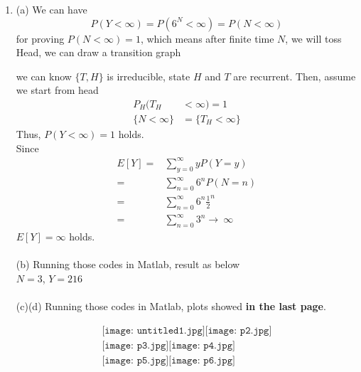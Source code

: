 \documentclass[12pt]{article}
\theoremstyle{remark}
\theoremstyle{definition}
\numberwithin{figure}{section}
\newcounter{fig}
\begin{document}
\begin{enumerate}[\textbf{4.}]
  \item 
(a) We can have 
\begin{equation*}
    P(Y<\infty ) = P(6^N <\infty )= P(N< \infty )
\end{equation*}
for proving $P(N< \infty) =1$, which means after finite time $N$, we will toss Head, we can draw a transition graph\\
\begin{center}
\end{center}
we can know $\big\{T,H\big\}$ is irreducible, state $H$ and $T$ are recurrent. Then, assume we start from head 
\begin{equation*}
\begin{align*}
     P_H(T_H &< \infty) = 1 \\
     \big\{N<\infty \big\}&=\big\{T_H <\infty \big\}
\end{align*}
\end{equation*}
Thus, $P(Y<\infty ) =1$ holds.\\
Since
\begin{equation*}
\begin{align*}
   E[Y]=& \sum_{y=0}^{\infty } yP(Y=y)\\
       =& \sum_{n=0}^{\infty } 6^{n}P(N=n)\\
       =& \sum_{n=0}^{\infty } 6^{n}\frac{1}{2}^{n}\\
       =& \sum_{n=0}^{\infty } 3^{n} \to\ \infty 
\end{align*}   
\end{equation*}
$E[Y] = \infty $ holds.\\
\\
(b) Running those codes in Matlab, result as below\\
$N=3$, $Y=216$\\
\\
(c)(d) Running those codes in Matlab, plots showed \textbf{in the last page}.\\
\begin{figure}[h!]
\begin{align*}
\texttt{[image: untitled1.jpg]}
\texttt{[image: p2.jpg]}\\
\texttt{[image: p3.jpg]}
\texttt{[image: p4.jpg]}\\
\texttt{[image: p5.jpg]}
\texttt{[image: p6.jpg]}
\end{align*}
\end{figure}


\end{enumerate}
\end{document}
